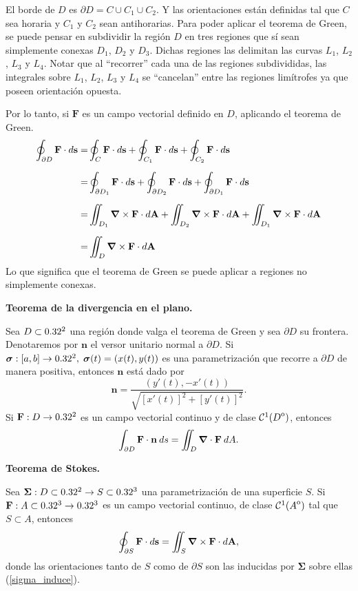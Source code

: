 \begin{obs}
    El borde de $D$ es $\partial D=C\cup C_1\cup C_2$. Y las orientaciones est\'an definidas tal que $C$ sea horaria y $C_1$ y $C_2$ sean antihorarias. Para poder aplicar el teorema de Green, se puede pensar en subdividir la regi\'on $D$ en tres regiones que s\'i sean simplemente conexas $D_1$, $D_2$ y $D_3$. Dichas regiones las delimitan las curvas $L_1$, $L_2$, $L_3$ y $L_4$. Notar que al ``recorrer'' cada una de las regiones subdivididas, las integrales sobre $L_1$, $L_2$, $L_3$ y $L_4$ se ``cancelan'' entre las regiones lim\'itrofes ya que poseen orientación opuesta. 
    
    Por lo tanto, si $\mathbf{F}$ es un campo vectorial definido en $D$, aplicando el teorema de Green.
    \begin{align*}
        \oint_{\partial D} \mathbf{F}\cdot d\mathbf{s}=&\oint_{C}\mathbf{F}\cdot d\mathbf{s}+\oint_{C_1}\mathbf{F}\cdot d\mathbf{s}+\oint_{C_2}\mathbf{F}\cdot d\mathbf{s}\\[.2cm]
        =&\oint_{\partial D_1}\mathbf{F}\cdot d\mathbf{s}+\oint_{\partial D_2}\mathbf{F}\cdot d\mathbf{s}+\oint_{\partial D_1}\mathbf{F}\cdot d\mathbf{s}\\[.2cm]
        =&\iint_{ D_1}\grad\times\mathbf{F}\cdot d\mathbf{A}+\iint_{ D_2}\grad\times\mathbf{F}\cdot d\mathbf{A}+\iint_{ D_1}\grad\times\mathbf{F}\cdot d\mathbf{A}\\[.2cm]
        =&\iint_D \grad\times\mathbf{F}\cdot d\mathbf{A}
    \end{align*}
    Lo que significa que el teorema de Green se puede aplicar a regiones no simplemente conexas.
\end{obs}

\begin{theorem}
\textbf{Teorema de la divergencia en el plano.}

Sea $D\subset0.32^2$ una regi\'on donde valga el teorema de Green y sea $\partial D$ su frontera. Denotaremos por $\mathbf{n}$ el versor unitario normal a $\partial D$.  Si $\boldsymbol{\sigma}:[a,b]\to0.32^2,\;\boldsymbol{\sigma}(t)=(x(t),y(t))$ es una parametrizaci\'on que recorre a $\partial D$ de manera positiva,  entonces  $\mathbf{n}$ est\'a dado por 
\[
    \mathbf{n}=\frac{(y'(t),-x'(t))}{\sqrt{[x'(t)]^2+[y'(t)]^2}}.
\]
Si $\mathbf{F}:  D\to 0.32^2$ es un campo vectorial continuo y de clase $\mathcal{C}^1({\kern0ptD}^{\mathrm{o}})$,  entonces
\[
    \int_{\partial D}\mathbf{F}\cdot\mathbf{n}\:ds=\iint_D\grad\cdot\mathbf{F}\:dA.
\]
\end{theorem}

\begin{theorem}
\textbf{Teorema de Stokes.} 

Sea $\boldsymbol{\Sigma}:D\subset0.32^2 \to S\subset0.32^3$    una parametrizaci\'on de una superficie $S$.   Si $\mathbf{F}:  A\subset 0.32^3\to 0.32^3$ es un campo vectorial continuo, de clase  $\mathcal{C}^1({\kern0ptA}^{\mathrm{o}})$ tal que  $S \subset A$, entonces
\[
    \oint_{\partial S}\mathbf{F}\cdot d\mathbf{s}=\iint_S\grad\times\mathbf{F}\cdot d\mathbf{A}, 
\]  donde las orientaciones tanto de  $S$ como de $\partial S$ son las inducidas por $\boldsymbol{\Sigma}$ sobre ellas (\ref{sigma_induce}).

\end{theorem}

